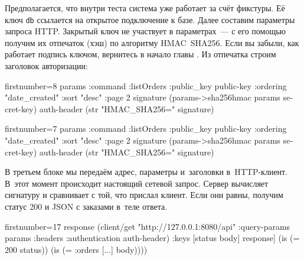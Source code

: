 \fi

\wavebottom

Предполагается, что внутри теста система уже работает за счёт фикстуры. Её ключ
\verb|db| ссылается на открытое подключение к базе. Далее составим параметры
запроса HTTP. Закрытый ключ не участвует в параметрах~--- с его помощью получим
их отпечаток (хэш) по алгоритму HMAC~SHA256. Если вы забыли, как работает
подпись ключом, вернитесь в начало главы . Из отпечатка строим
заголовок авторизации:

\wavetop

\ifx\DEVICETYPE\MOBILE

\begin{english}
  \begin{clojure/lines*}{firstnumber=8}
    params {:command :listOrders
            :public_key public-key
            :ordering "date_created"
            :sort "desc"
            :page 2}
    signature (params->sha256hmac
                params secret-key)
    auth-header (str "HMAC_SHA256="
                  signature)
  \end{clojure/lines*}
\end{english}

\else

\begin{english}
  \begin{clojure/lines*}{firstnumber=7}
        params {:command :listOrders
                :public_key public-key
                :ordering "date_created"
                :sort "desc"
                :page 2}
        signature (params->sha256hmac params secret-key)
        auth-header (str "HMAC_SHA256=" signature)
  \end{clojure/lines*}
\end{english}

\fi

\wavebottom

В третьем блоке мы передаём адрес, параметры и~заголовки в~HTTP-клиент. В~этот
момент происходит настоящий сетевой запрос. Сервер вычисляет сигнатуру и
сравнивает с той, что прислал клиент. Если они равны, получим статус 200 и JSON
с заказами в~теле ответа.

\wavetop

\ifx\DEVICETYPE\MOBILE

\begin{english}
  \begin{clojure/lines*}{firstnumber=17}
    response
    (client/get
      "http://127.0.0.1:8080/api"
      {:query-params params
       :headers {:authentication
                 auth-header}})
    {:keys [status body]} response]
(is (= 200 status))
(is (= {:orders [...]} body))))
  \end{clojure/lines*}
\end{english}

